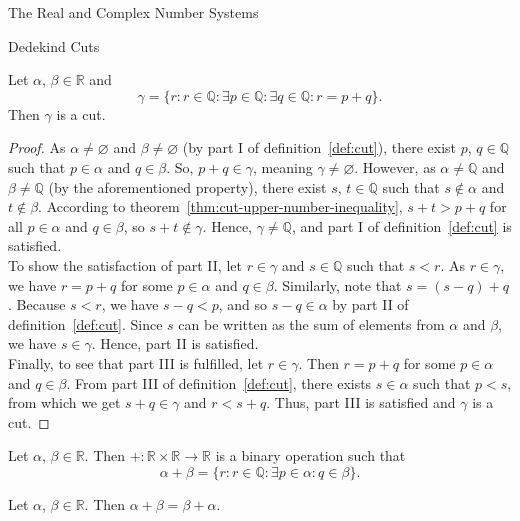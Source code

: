 \begin{chapter}{The Real and Complex Number Systems}
\begin{section}{Dedekind Cuts}
	\begin{theorem}
	\label{thm:cut-addition-closure}
		Let $\alpha$, $\beta \in \mathbb{R}$ and
		\[ \gamma = \{r : r \in \mathbb{Q} : \exists p \in \mathbb{Q}
			: \exists q \in \mathbb{Q} : r = p + q\}. \] 
		Then $\gamma$ is a cut.
	\end{theorem}

	\begin{proof}
		As $\alpha \neq \varnothing$ and $\beta \neq \varnothing$ (by part I of
		definition~\ref{def:cut}), there exist $p$, $q \in \mathbb{Q}$ such that
		$p \in \alpha$ and $q \in \beta$. So, $p + q \in \gamma$, meaning
		$\gamma \neq \varnothing$. However, as $\alpha \neq \mathbb{Q}$ and
		$\beta \neq \mathbb{Q}$ (by the aforementioned property), there exist
		$s$, $t \in \mathbb{Q}$ such that $s \nin \alpha$ and $t \nin \beta$.
		According to theorem~\ref{thm:cut-upper-number-inequality}, $s + t > p +
		q$ for all $p \in \alpha$ and $q \in \beta$, so $s + t \nin \gamma$.
		Hence, $\gamma \neq \mathbb{Q}$, and part I of definition~\ref{def:cut}
		is satisfied. \\

		To show the satisfaction of part II, let $r \in \gamma$ and $s \in
		\mathbb{Q}$ such that $s < r$. As $r \in \gamma$, we have $r = p +
		q$ for some $p \in \alpha$ and $q \in \beta$. Similarly, note that $s
		= (s - q) + q$. Because $s < r$, we have $s - q < p$, and so $s - q
		\in \alpha$ by part II of definition~\ref{def:cut}. Since $s$ can be
		written as the sum of elements from $\alpha$ and $\beta$, we have $s
		\in \gamma$. Hence, part II is satisfied. \\

		Finally, to see that part III is fulfilled, let $r \in \gamma$. Then $r 
		= p + q$ for some $p \in \alpha$ and $q \in \beta$. From part III of
		definition~\ref{def:cut}, there exists $s \in \alpha$ such that $p <
		s$, from which we get $s + q \in \gamma$ and $r < s + q$. Thus, part
		III is satisfied and $\gamma$ is a cut.
	\end{proof}

	\begin{definition}
		\label{def:cut-addition}
		Let $\alpha$, $\beta \in \mathbb{R}$. Then $+ \colon \mathbb{R} \times
		\mathbb{R} \to \mathbb{R}$ is a binary operation such that
		\[ \alpha + \beta = \{r : r \in \mathbb{Q} : \exists p \in \alpha
			: q \in \beta\}. \] 
	\end{definition}

	\begin{theorem}
		\label{thm:cut-addition-commutativity}
		Let $\alpha$, $\beta \in \mathbb{R}$. Then $\alpha + \beta = \beta +
		\alpha$.
	\end{theorem}


\end{section}
\end{chapter}

